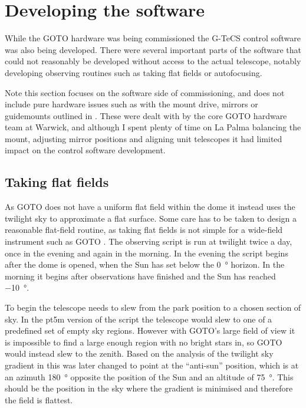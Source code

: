 \section{Developing the software}
\label{sec:software_commissioning}
\begin{colsection}


\begin{colsection}

While the GOTO hardware was being commissioned the G-TeCS control software was also being developed. There were several important parts of the software that could not reasonably be developed without access to the actual telescope, notably developing observing routines such as taking flat fields or autofocusing.

Note this section focuses on the software side of commissioning, and does not include pure hardware issues such as with the mount drive, mirrors or guidemounts outlined in . These were dealt with by the core GOTO hardware team at Warwick, and although I spent plenty of time on La Palma balancing the mount, adjusting mirror positions and aligning unit telescopes it had limited impact on the control software development.

\end{colsection}


\subsection{Taking flat fields}
\label{sec:flats}
\begin{colsection}

As GOTO does not have a uniform flat field within the dome it instead uses the twilight sky to approximate a flat surface. Some care has to be taken to design a reasonable flat-field routine, as taking flat fields is not simple for a wide-field instrument such as GOTO \citep{flats3, flats2}. The  observing script is run at twilight twice a day, once in the evening and again in the morning. In the evening the script begins after the dome is opened, when the Sun has set below the \SI{0}{\degree} horizon. In the morning it begins after observations have finished and the Sun has reached \SI{-10}{\degree}.

To begin the telescope needs to slew from the park position to a chosen section of sky. In the pt5m version of the script the telescope would slew to one of a predefined set of empty sky regions. However with GOTO's large field of view it is impossible to find a large enough region with no bright stars in, so GOTO would instead slew to the zenith. Based on the analysis of the twilight sky gradient in \citet{flats} this was later changed to point at the ``anti-sun'' position, which is at an azimuth \SI{180}{\degree} opposite the position of the Sun and an altitude of \SI{75}{\degree}. This should be the position in the sky where the gradient is minimised and therefore the field is flattest.


\end{colsection}
\end{colsection}
